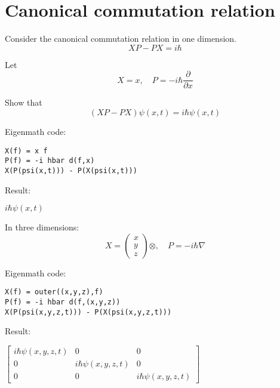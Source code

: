 

\section*{Canonical commutation relation}

Consider the canonical commutation relation in one dimension.
\begin{equation*}
XP-PX=i\hbar
\end{equation*}

Let
\begin{equation*}
X=x,\quad P=-i\hbar\frac{\partial}{\partial x}
\end{equation*}

Show that
\begin{equation*}
(XP-PX)\psi(x,t)=i\hbar\psi(x,t)
\end{equation*}

Eigenmath code:
{\color{blue}
\begin{verbatim}
X(f) = x f
P(f) = -i hbar d(f,x)
X(P(psi(x,t))) - P(X(psi(x,t)))
\end{verbatim}}

Result:

\bigskip
$i\hbar\psi(x,t)$

\bigskip
In three dimensions:
\begin{equation*}
X=\begin{pmatrix}x\\y\\z\end{pmatrix}\otimes,\quad P=-i\hbar\nabla
\end{equation*}

Eigenmath code:
{\color{blue}
\begin{verbatim}
X(f) = outer((x,y,z),f)
P(f) = -i hbar d(f,(x,y,z))
X(P(psi(x,y,z,t))) - P(X(psi(x,y,z,t)))
\end{verbatim}}

Result:

\bigskip
$\begin{bmatrix}
i\hbar\psi(x,y,z,t)&0&0\\
0&i\hbar\psi(x,y,z,t)&0\\
0&0&i\hbar\psi(x,y,z,t)
\end{bmatrix}
$


